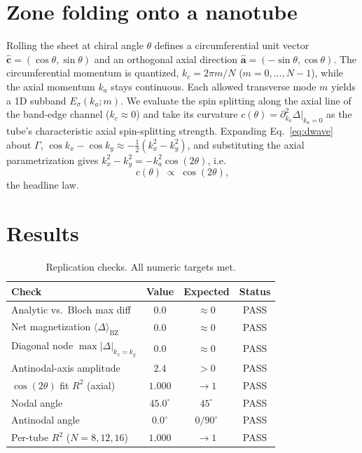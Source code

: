 \documentclass[11pt]{article}
\begin{document}
\section{Zone folding onto a nanotube}
Rolling the sheet at chiral angle $\theta$ defines a circumferential unit vector
$\hat{\mathbf c}=(\cos\theta,\sin\theta)$ and an orthogonal axial direction
$\hat{\mathbf a}=(-\sin\theta,\cos\theta)$. The circumferential momentum is quantized,
$k_c=2\pi m/N$ ($m=0,\dots,N-1$), while the axial momentum $k_a$ stays continuous. Each allowed
transverse mode $m$ yields a 1D subband $E_\sigma(k_a;m)$. We evaluate the spin splitting along
the axial line of the band-edge channel ($k_c\!\approx\!0$) and take its curvature
$c(\theta)=\partial^2_{k_a}\Delta|_{k_a=0}$ as the tube's characteristic axial spin-splitting
strength. Expanding Eq.~\eqref{eq:dwave} about $\Gamma$,
$\cos k_x-\cos k_y\approx-\tfrac12(k_x^2-k_y^2)$, and substituting the axial parametrization
gives $k_x^2-k_y^2=-k_a^2\cos(2\theta)$, i.e.
\begin{equation}
c(\theta)\;\propto\;\cos(2\theta),
\label{eq:cos2}
\end{equation}
the headline law.

\section{Results}
\begin{table}[h]\centering
\begin{tabular}{lccc}
\toprule
Check & Value & Expected & Status \\
\midrule
Analytic vs.\ Bloch max diff & $0.0$ & $\approx0$ & PASS \\
Net magnetization $\langle\Delta\rangle_{\mathrm{BZ}}$ & $0.0$ & $\approx0$ & PASS \\
Diagonal node $\max|\Delta|_{k_x=k_y}$ & $0.0$ & $\approx0$ & PASS \\
Antinodal-axis amplitude & $2.4$ & $>0$ & PASS \\
$\cos(2\theta)$ fit $R^2$ (axial) & $1.000$ & $\to1$ & PASS \\
Nodal angle & $45.0^\circ$ & $45^\circ$ & PASS \\
Antinodal angle & $0.0^\circ$ & $0/90^\circ$ & PASS \\
Per-tube $R^2$ ($N=8,12,16$) & $1.000$ & $\to1$ & PASS \\
\bottomrule
\end{tabular}
\caption{Replication checks. All numeric targets met.}
\end{table}
\end{document}
